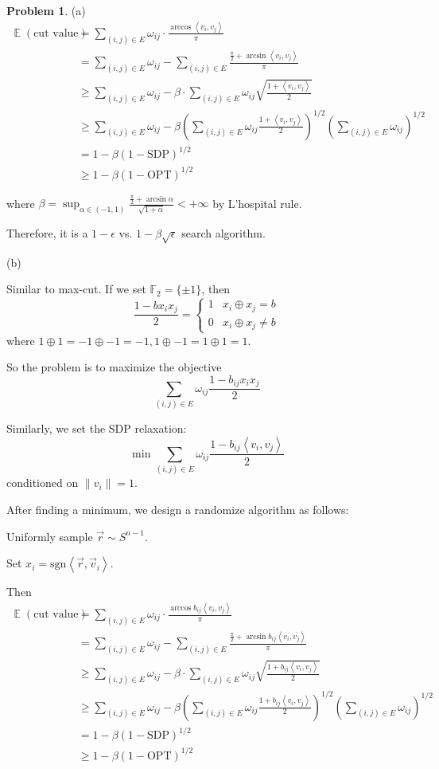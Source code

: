 \documentclass[a4paper]{article}
\theoremstyle{definition}
\newtheorem{problem}{Problem}
\theoremstyle{plain}
\newcommand{\Ebb}{\mathop\mathbb E}
\newcommand{\sgn}{\mathrm{sgn}}
\newcommand{\<}{\left<}
\renewcommand{\>}{\right>}
\newcommand{\OPT}{\mathrm{OPT}}
\numberwithin{equation}{problem}
\begin{document}
\begin{problem}
  (a) 
  \[\begin{aligned}
    \Ebb(\text{cut value})&=\sum_{(i,j)\in E}\omega_{ij}\cdot\frac{\arccos \<v_i,v_j\>}{\pi}\\
    &=\sum_{(i,j)\in E}\omega_{ij}-\sum_{(i,j)\in E}\frac{\frac{\pi}{2}+\arcsin \<v_i,v_j\>}{\pi}\\
    & \geq \sum_{(i,j)\in E}\omega_{ij}-\beta\cdot\sum_{(i,j)\in E}\omega_{ij}\sqrt{\frac{1+\<v_i,v_j\>}{2}}\\ 
    & \geq \sum_{(i,j)\in E}\omega_{ij}-\beta\left(\sum_{(i,j)\in E}\omega_{ij}\frac{1+\<v_i,v_j\>}{2}\right)^{1/2}\left(\sum_{(i,j)\in E}\omega_{ij}\right)^{1/2}\\
    &=1-\beta (1-\mathrm{SDP})^{1/2}\\
    & \geq 1-\beta(1-\OPT)^{1/2}
  \end{aligned}\]

  where  $ \beta=\sup_{\alpha\in(-1,1)}\frac{\frac{\pi}{2}+\arcsin \alpha}{\sqrt{1+\alpha}}<+\infty $ by L'hospital rule.

  Therefore, it is a  $ 1-\epsilon $ vs.  $ 1-\beta\sqrt{\epsilon} $ search algorithm.
  
  (b)

  Similar to max-cut. If we set  $ \mathbb{F}_{2}=\{\pm 1\} $,  then 
  \[\frac{1-bx_ix_j}{2}=\begin{cases}
    1&x_i\oplus x_j=b\\
    0&x_i\oplus x_j\neq b
  \end{cases}\]
  where  $ 1\oplus 1=-1\oplus -1=-1,1\oplus -1=1\oplus 1=1  $.
  
  So the problem is to maximize the objective 
  \[\sum_{(i,j)\in E}\omega_{ij}\frac{1-b_{ij}x_ix_j}{2}\]

  Similarly, we set the SDP relaxation:
  \[\min\sum_{(i,j)\in E}\omega_{ij}\frac{1-b_{ij}\<v_i,v_j\>}{2}\]
  conditioned on  $ \|v_i\|=1 $.
  
  After finding a minimum, we design a randomize algorithm as follows:

  Uniformly sample  $ \vec{r}\sim S^{n-1} $.
  
  Set  $ x_i=\sgn\<\vec{r},\vec{v}_i\> $.
  
  Then 
  \[\begin{aligned}
    \Ebb(\text{cut value})&=\sum_{(i,j)\in E}\omega_{ij}\cdot\frac{\arccos b_{ij}\<v_i,v_j\>}{\pi}\\
    &=\sum_{(i,j)\in E}\omega_{ij}-\sum_{(i,j)\in E}\frac{\frac{\pi}{2}+\arcsin b_{ij}\<v_i,v_j\>}{\pi}\\
    & \geq \sum_{(i,j)\in E}\omega_{ij}-\beta\cdot\sum_{(i,j)\in E}\omega_{ij}\sqrt{\frac{1+b_{ij}\<v_i,v_j\>}{2}}\\ 
    & \geq \sum_{(i,j)\in E}\omega_{ij}-\beta\left(\sum_{(i,j)\in E}\omega_{ij}\frac{1+b_{ij}\<v_i,v_j\>}{2}\right)^{1/2}\left(\sum_{(i,j)\in E}\omega_{ij}\right)^{1/2}\\
    &=1-\beta (1-\mathrm{SDP})^{1/2}\\
    & \geq 1-\beta(1-\OPT)^{1/2}
  \end{aligned}\]


\end{problem}
\end{document}
